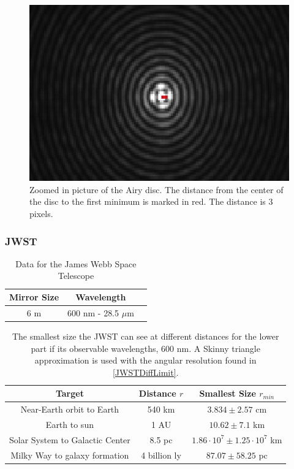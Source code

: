 \documentclass{emulateapj}
\begin{document}
\begin{figure}[H]
\centering
\includegraphics[scale=0.4]{Airy3zoomed2.png}
\caption{Zoomed in picture of the Airy disc. The distance from the center of the disc to the first minimum is marked in red. The distance is 3 pixels.}
\end{figure}\label{fig:airy}

\subsubsection{JWST}
\begin{table}[H]
\centering
\begin{tabular}{ c c c }
Mirror Size & Wavelength \\
\hline
6 m & 600 nm - 28.5 $\mu$m 
\end{tabular}
\caption{Data for the James Webb Space Telescope}
\end{table}\label{tab:dataJWST}

\begin{table}[H]
\centering
\begin{tabular}{ c c c }
Target & Distance $r$ & Smallest Size $r_{min}$ \\
\hline
Near-Earth orbit to Earth & 540 km &$3.834 \pm 2.57$ cm \\
Earth to sun & 1 AU & $10.62 \pm 7.1$ km \\
Solar System to Galactic Center & 8.5 pc & $1.86\cdot 10^7 \pm 1.25\cdot 10^7$ km \\
Milky Way to galaxy formation &  4 billion ly & $87.07 \pm 58.25$ pc 
\end{tabular}
\caption{The smallest size the JWST can see at different distances for the lower part if its observable wavelengths, $600$ nm. A Skinny triangle approximation is used with the angular resolution found in \eqref{JWSTDiffLimit}.}
\end{table}\label{tab:visionJWSTLow}
\end{document}
